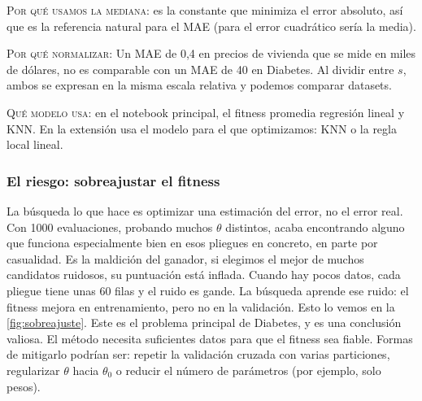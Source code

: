 \textsc{Por qué usamos la mediana}: es la constante que minimiza el error absoluto, así que es la referencia natural para el MAE (para el error cuadrático sería la media). 

\textsc{Por qué normalizar}: Un MAE de 0,4 en precios de vivienda que se mide en miles de dólares, no es comparable con un MAE de 40 en Diabetes. Al dividir entre $s$, ambos se expresan en la misma escala relativa y podemos comparar datasets. 

\textsc{Qué modelo usa}: en el notebook principal, el fitness promedia regresión lineal y KNN. En la extensión usa el modelo para el que optimizamos: KNN o la regla local lineal. 

\subsubsection{El riesgo: sobreajustar el fitness}
La búsqueda lo que hace es optimizar una estimación del error, no el error real. Con 1000 evaluaciones, probando muchos $\theta$ distintos, acaba encontrando alguno que funciona especialmente bien en esos pliegues en concreto, en parte por casualidad. Es la maldición del ganador, si elegimos el mejor de muchos candidatos ruidosos, su puntuación está inflada. Cuando hay pocos datos, cada pliegue tiene unas 60 filas y el ruido es gande. La búsqueda aprende ese ruido: el fitness mejora en entrenamiento, pero no en la validación. Esto lo vemos en la \autoref{fig:sobreajuste}. Este es el problema principal de Diabetes, y es una conclusión valiosa. El método necesita suficientes datos para que el fitness sea fiable. Formas de mitigarlo podrían ser: repetir la validación cruzada con varias particiones, regularizar $\theta$ hacia $\theta_{0}$ o reducir el número de parámetros (por ejemplo, solo pesos).


